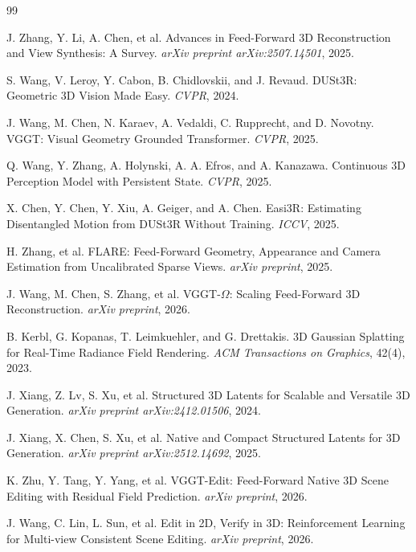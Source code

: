\newpage
\begin{thebibliography}{99}

J. Zhang, Y. Li, A. Chen, et al.
\newblock Advances in Feed-Forward 3D Reconstruction and View Synthesis: A Survey.
\newblock \emph{arXiv preprint arXiv:2507.14501}, 2025.

S. Wang, V. Leroy, Y. Cabon, B. Chidlovskii, and J. Revaud.
\newblock DUSt3R: Geometric 3D Vision Made Easy.
\newblock \emph{CVPR}, 2024.

J. Wang, M. Chen, N. Karaev, A. Vedaldi, C. Rupprecht, and D. Novotny.
\newblock VGGT: Visual Geometry Grounded Transformer.
\newblock \emph{CVPR}, 2025.

Q. Wang, Y. Zhang, A. Holynski, A. A. Efros, and A. Kanazawa.
\newblock Continuous 3D Perception Model with Persistent State.
\newblock \emph{CVPR}, 2025.

X. Chen, Y. Chen, Y. Xiu, A. Geiger, and A. Chen.
\newblock Easi3R: Estimating Disentangled Motion from DUSt3R Without Training.
\newblock \emph{ICCV}, 2025.

H. Zhang, et al.
\newblock FLARE: Feed-Forward Geometry, Appearance and Camera Estimation from Uncalibrated Sparse Views.
\newblock \emph{arXiv preprint}, 2025.

J. Wang, M. Chen, S. Zhang, et al.
\newblock VGGT-$\Omega$: Scaling Feed-Forward 3D Reconstruction.
\newblock \emph{arXiv preprint}, 2026.

B. Kerbl, G. Kopanas, T. Leimkuehler, and G. Drettakis.
\newblock 3D Gaussian Splatting for Real-Time Radiance Field Rendering.
\newblock \emph{ACM Transactions on Graphics}, 42(4), 2023.

J. Xiang, Z. Lv, S. Xu, et al.
\newblock Structured 3D Latents for Scalable and Versatile 3D Generation.
\newblock \emph{arXiv preprint arXiv:2412.01506}, 2024.

J. Xiang, X. Chen, S. Xu, et al.
\newblock Native and Compact Structured Latents for 3D Generation.
\newblock \emph{arXiv preprint arXiv:2512.14692}, 2025.

K. Zhu, Y. Tang, Y. Yang, et al.
\newblock VGGT-Edit: Feed-Forward Native 3D Scene Editing with Residual Field Prediction.
\newblock \emph{arXiv preprint}, 2026.

J. Wang, C. Lin, L. Sun, et al.
\newblock Edit in 2D, Verify in 3D: Reinforcement Learning for Multi-view Consistent Scene Editing.
\newblock \emph{arXiv preprint}, 2026.


\end{thebibliography}
